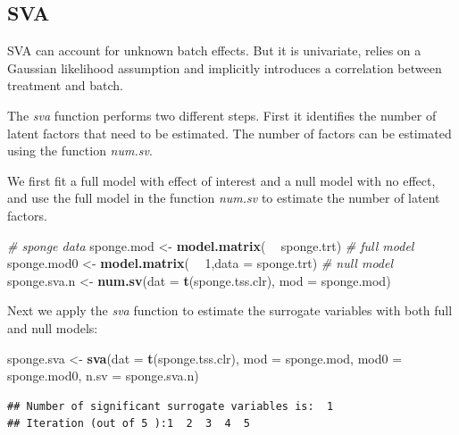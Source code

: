 \documentclass[]{book}
\newenvironment{Shaded}{\begin{snugshade}}{\end{snugshade}}
\newcommand{\KeywordTok}[1]{\textcolor[rgb]{0.13,0.29,0.53}{\textbf{#1}}}
\newcommand{\DataTypeTok}[1]{\textcolor[rgb]{0.13,0.29,0.53}{#1}}
\newcommand{\DecValTok}[1]{\textcolor[rgb]{0.00,0.00,0.81}{#1}}
\newcommand{\StringTok}[1]{\textcolor[rgb]{0.31,0.60,0.02}{#1}}
\newcommand{\CommentTok}[1]{\textcolor[rgb]{0.56,0.35,0.01}{\textit{#1}}}
\newcommand{\OperatorTok}[1]{\textcolor[rgb]{0.81,0.36,0.00}{\textbf{#1}}}
\newcommand{\NormalTok}[1]{#1}
\begin{document}
\subsection{SVA}\label{sva}

SVA can account for unknown batch effects. But it is univariate, relies
on a Gaussian likelihood assumption and implicitly introduces a
correlation between treatment and batch.

The \emph{sva} function performs two different steps. First it
identifies the number of latent factors that need to be estimated. The
number of factors can be estimated using the function \emph{num.sv}.

We first fit a full model with effect of interest and a null model with
no effect, and use the full model in the function \emph{num.sv} to
estimate the number of latent factors.

\begin{Shaded}
\begin{Highlighting}[]
\CommentTok{# sponge data}
\NormalTok{sponge.mod <-}\StringTok{ }\KeywordTok{model.matrix}\NormalTok{( }\OperatorTok{~}\StringTok{ }\NormalTok{sponge.trt) }\CommentTok{# full model}
\NormalTok{sponge.mod0 <-}\StringTok{ }\KeywordTok{model.matrix}\NormalTok{( }\OperatorTok{~}\StringTok{ }\DecValTok{1}\NormalTok{,}\DataTypeTok{data =}\NormalTok{ sponge.trt) }\CommentTok{# null model}
\NormalTok{sponge.sva.n <-}\StringTok{ }\KeywordTok{num.sv}\NormalTok{(}\DataTypeTok{dat =} \KeywordTok{t}\NormalTok{(sponge.tss.clr), }\DataTypeTok{mod =}\NormalTok{ sponge.mod)}
\end{Highlighting}
\end{Shaded}

Next we apply the \emph{sva} function to estimate the surrogate
variables with both full and null models:

\begin{Shaded}
\begin{Highlighting}[]
\NormalTok{sponge.sva <-}\StringTok{ }\KeywordTok{sva}\NormalTok{(}\DataTypeTok{dat =} \KeywordTok{t}\NormalTok{(sponge.tss.clr), }\DataTypeTok{mod =}\NormalTok{ sponge.mod, }
                 \DataTypeTok{mod0 =}\NormalTok{ sponge.mod0, }\DataTypeTok{n.sv =}\NormalTok{ sponge.sva.n)}
\end{Highlighting}
\end{Shaded}

\begin{verbatim}
## Number of significant surrogate variables is:  1 
## Iteration (out of 5 ):1  2  3  4  5
\end{verbatim}
\end{document}
